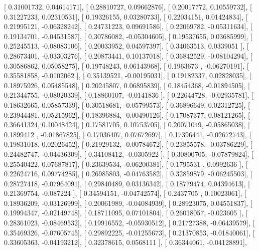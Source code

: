 \documentclass{article}
\begin{document}
       [ 0.31001732,  0.04614171],
       [ 0.28810727,  0.09662876],
       [ 0.20017772,  0.10559732],
       [ 0.31227233,  0.02310531],
       [ 0.19326155,  0.03280733],
       [ 0.22034151,  0.01424834],
       [ 0.21995121, -0.06328242],
       [ 0.24731223,  0.09691586],
       [ 0.22069782, -0.05311634],
       [ 0.19134701, -0.04531587],
       [ 0.30786082, -0.05304605],
       [ 0.19537655,  0.03685999],
       [ 0.25245513, -0.08083106],
       [ 0.20033952,  0.04597397],
       [ 0.34063513,  0.0339051 ],
       [ 0.28673401, -0.03303276],
       [ 0.20873441,  0.10137018],
       [ 0.36842529, -0.08104294],
       [ 0.30586862,  0.05058275],
       [ 0.19748243,  0.06143968],
       [ 0.1963673 , -0.06270191],
       [ 0.35581858, -0.0102062 ],
       [ 0.35139521, -0.00195031],
       [ 0.19182337,  0.02828035],
       [ 0.18975926,  0.05485548],
       [ 0.20245807,  0.06895839],
       [ 0.18454368, -0.01894505],
       [ 0.21344755, -0.08020339],
       [ 0.18860107, -0.0141836 ],
       [ 0.22644728, -0.02935781],
       [ 0.18632665,  0.05857339],
       [ 0.30518681, -0.05799573],
       [ 0.36896649,  0.02312725],
       [ 0.23944481,  0.05215962],
       [ 0.18396884, -0.00490126],
       [ 0.17087377,  0.08121265],
       [ 0.36641324,  0.10048424],
       [ 0.17581705,  0.10753705],
       [ 0.20071049, -0.05865038],
       [ 0.1899412 , -0.01867825],
       [ 0.17036407,  0.07672697],
       [ 0.17396441, -0.02672743],
       [ 0.19831018,  0.02026452],
       [ 0.21929132, -0.00784672],
       [ 0.23855578, -0.03786229],
       [ 0.24482747, -0.04436309],
       [ 0.34108412, -0.0305922 ],
       [ 0.30800705, -0.07879824],
       [ 0.25540422,  0.07687817],
       [ 0.23639534, -0.06200381],
       [ 0.1795531 ,  0.0992636 ],
       [ 0.22624716,  0.09774285],
       [ 0.26985803, -0.04763582],
       [ 0.32859879, -0.06245503],
       [ 0.28727418, -0.07964091],
       [ 0.29840489,  0.03136342],
       [ 0.18779474,  0.04394613],
       [ 0.21369754, -0.087224  ],
       [ 0.34594151, -0.04742574],
       [ 0.2437705 ,  0.10023061],
       [ 0.18936209, -0.03126999],
       [ 0.20061989, -0.04084939],
       [ 0.28923075,  0.04551837],
       [ 0.19994347, -0.02149748],
       [ 0.18711095,  0.07101804],
       [ 0.26018057, -0.023605  ],
       [ 0.28361023, -0.08469532],
       [ 0.19916552, -0.05930512],
       [ 0.21727388, -0.06439579],
       [ 0.35469326, -0.07605745],
       [ 0.29892225, -0.01255673],
       [ 0.21370853, -0.01840061],
       [ 0.33605363, -0.04193212],
       [ 0.32378615,  0.0568111 ],
       [ 0.36344061, -0.04128891],
\end{document}
